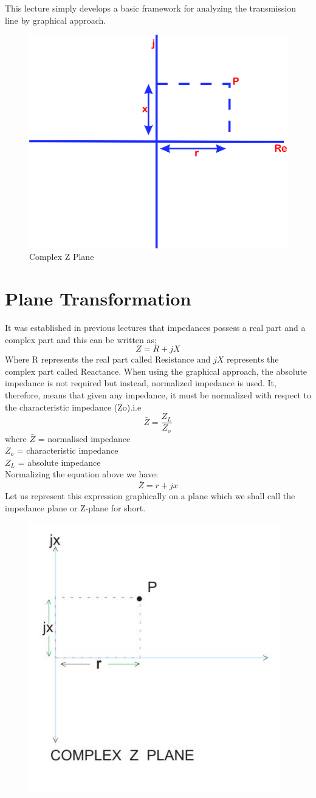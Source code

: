 This lecture simply develops a basic framework for analyzing the transmission line by graphical approach.
\begin{figure}[h]
\centering
\includegraphics[width=0.5\linewidth]{./graphics/mjhdj}
\caption{Complex Z Plane}
\label{fig:mjhdj}
\end{figure}

\section{Plane Transformation}
It was established in previous lectures that impedances possess a real part and a complex part and this can be written as;
\begin{equation*}
Z= R+jX
\end{equation*}
Where R  represents the real part called Resistance and $jX$ represents the complex part called Reactance. When using the graphical approach, the absolute impedance is not required but instead, normalized impedance is used. It, therefore, means that given any impedance, it must be normalized with respect to the characteristic impedance (Zo).i.e
\begin{equation*}
\bar{Z}=\frac{Z_L}{Z_o}
\end{equation*}
where $\bar{Z}$ = normalised impedance\\
$Z_o$ = characteristic impedance\\
$Z_L$   =  absolute  impedance \\
Normalizing the equation above we have: 
\begin{equation*}
\bar{Z}= r + jx
\end{equation*}
Let us represent this expression graphically on a plane which we shall call the impedance plane or Z-plane for short.
\begin{figure}[h]
\center\includegraphics[width=0.5\linewidth]{./graphics/TransLine2}
\label{fig:transline2}
\end{figure}

